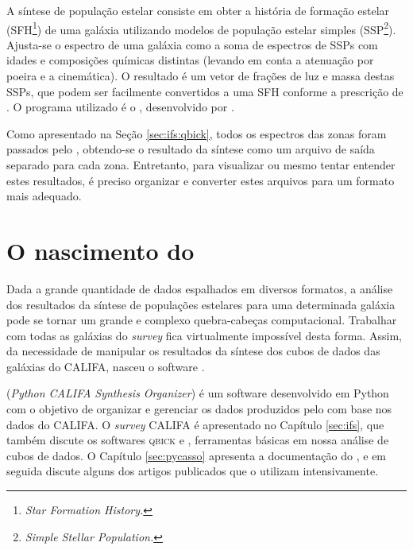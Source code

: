 
A síntese de população estelar consiste em obter a história de formação estelar
(SFH\footnote{\em Star Formation History.}) de uma galáxia utilizando modelos de
população estelar simples (SSP\footnote{\em Simple Stellar Population.}).
Ajusta-se o espectro de uma galáxia como a soma de espectros de SSPs com idades
e composições químicas distintas (levando em conta a atenuação por poeira e a
cinemática).
O resultado é um vetor de frações de luz e massa destas SSPs, que podem ser
facilmente convertidos a uma SFH conforme a prescrição de \citet{Asari2007}.
O programa utilizado é o \starlight, desenvolvido por \citet{CidFernandes2005}.

Como apresentado na Seção \ref{sec:ifs:qbick}, todos os espectros das zonas foram
passados pelo \starlight, obtendo-se o resultado da síntese como um arquivo de
saída separado para cada zona. Entretanto, para visualizar ou mesmo tentar
entender estes resultados, é preciso organizar e converter estes arquivos para
um formato mais adequado.




\section{O nascimento do \pycasso}

Dada a grande quantidade de dados espalhados em diversos formatos, a análise dos
resultados da síntese de populações estelares para uma determinada galáxia pode
se tornar um grande e complexo quebra-cabeças computacional. Trabalhar com todas
as galáxias do {\em survey} fica virtualmente impossível desta forma. Assim, da
necessidade de manipular os resultados da síntese dos cubos de dados das
galáxias do CALIFA, nasceu o software \pycasso.

\pycasso ({\em Python CALIFA \starlight Synthesis Organizer}) é um software
desenvolvido em Python com o objetivo de organizar e gerenciar os dados
produzidos pelo \starlight com base nos dados do CALIFA. O {\em survey} CALIFA é
apresentado no Capítulo \ref{sec:ifs}, que também discute os softwares
\textsc{qbick} e \starlight, ferramentas básicas em nossa análise de cubos de
dados. O Capítulo \ref{sec:pycasso} apresenta a documentação do \pycasso, e em
seguida discute alguns dos artigos publicados que o utilizam intensivamente.


